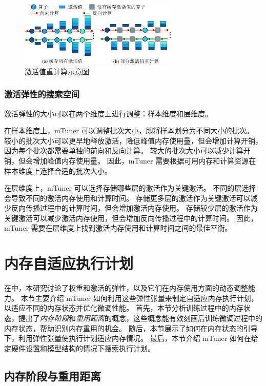 \begin{figure}[ht]
\centerline{\includegraphics[width=0.68\textwidth]{figures/mtuner/activation-checkpoint-crop.pdf}}
\caption{激活值重计算示意图}
\label{fig:activation-checkpoint}
\end{figure}


\subsubsection{激活弹性的搜索空间}
激活弹性的大小可以在两个维度上进行调整：样本维度和层维度。

在样本维度上，mTuner 可以调整批次大小，即将样本划分为不同大小的批次。
较小的批次大小可以更早地释放激活，降低峰值内存使用量，但会增加计算开销，因为每个批次都需要单独的前向和反向计算。
较大的批次大小可以减少计算开销，但会增加峰值内存使用量。
因此，mTuner 需要根据可用内存和计算资源在样本维度上选择合适的批次大小。

在层维度上，mTuner 可以选择存储哪些层的激活作为关键激活。
不同的层选择会导致不同的激活内存使用和计算时间。
存储更多层的激活作为关键激活可以减少反向传播过程中的计算时间，但会增加激活内存使用。
存储较少层的激活作为关键激活可以减少激活内存使用，但会增加反向传播过程中的计算时间。
因此，mTuner 需要在层维度上找到激活内存使用和计算时间之间的最佳平衡。

\section{内存自适应执行计划}
\label{mtuner:sec:training-plan}

在中，本研究讨论了权重和激活的弹性，以及它们在内存使用方面的动态调整能力。
本节主要介绍 mTuner 如何利用这些弹性张量来制定自适应内存执行计划，以适应不同的内存状态并优化微调性能。
首先，本节分析训练过程中的内存状态，提出了\textit{内存阶段}和\textit{重用距离}的概念，这些概念能有效刻画后训练微调过程中的内存状态，帮助识别内存重用的机会。
随后，本节展示了如何在内存状态的引导下，利用弹性张量使执行计划适应内存情况。
最后，本节介绍 mTuner 如何在给定硬件设置和模型结构的情况下搜索执行计划。

\subsection{内存阶段与重用距离}

